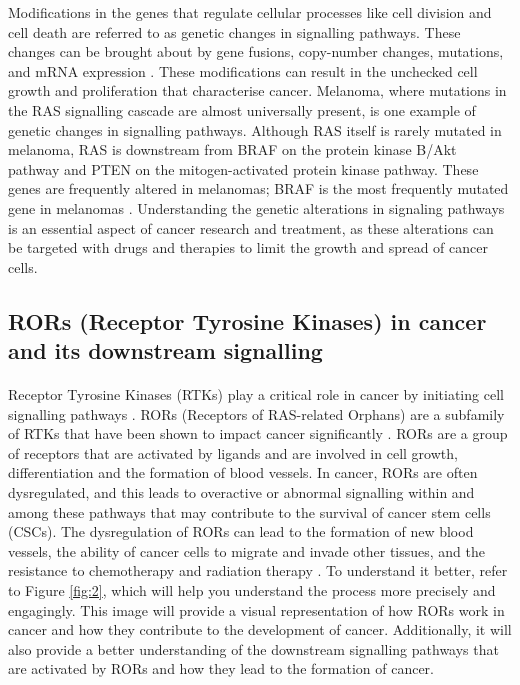 Modifications in the genes that regulate cellular processes like cell division and cell death are referred to as genetic changes in signalling pathways\cite{strasser2000apoptosis}. These changes can be brought about by gene fusions, copy-number changes, mutations, and mRNA expression \cite{kang2016integrated}. These modifications can result in the unchecked cell growth and proliferation that characterise cancer. Melanoma, where mutations in the RAS signalling cascade are almost universally present, is one example of genetic changes in signalling pathways. Although RAS itself is rarely mutated in melanoma, RAS is downstream from BRAF on the protein kinase B/Akt pathway and PTEN on the mitogen-activated protein kinase pathway. These genes are frequently altered in melanomas; BRAF is the most frequently mutated gene in melanomas \cite{haluska2006genetic}. Understanding the genetic alterations in signaling pathways is an essential aspect of cancer research and treatment, as these alterations can be targeted with drugs and therapies to limit the growth and spread of cancer cells. 



\subsection{RORs (Receptor Tyrosine Kinases) in cancer and its downstream signalling}
\paragraph{}

Receptor Tyrosine Kinases (RTKs) play a critical role in cancer by initiating cell signalling pathways \cite{butti2018receptor}. RORs (Receptors of RAS-related Orphans) are a subfamily of RTKs that have been shown to impact cancer significantly \cite{kamrani2019therapeutic}. RORs are a group of receptors that are activated by ligands and are involved in cell growth, differentiation and the formation of blood vessels. In cancer, RORs are often dysregulated, and this leads to overactive or abnormal signalling within and among these pathways that may contribute to the survival of cancer stem cells (CSCs). The dysregulation of RORs can lead to the formation of new blood vessels, the ability of cancer cells to migrate and invade other tissues, and the resistance to chemotherapy and radiation therapy \cite{pan2016emerging, mahmoudian2021interaction}. To understand it better, refer to Figure \ref{fig:2}, which will help you understand the process more precisely and engagingly. This image will provide a visual representation of how RORs work in cancer and how they contribute to the development of cancer. Additionally, it will also provide a better understanding of the downstream signalling pathways that are activated by RORs and how they lead to the formation of cancer.


